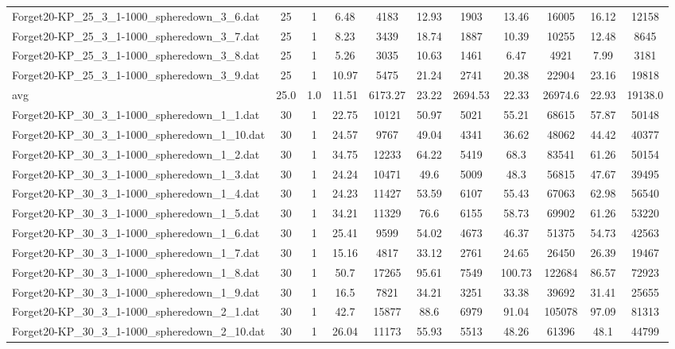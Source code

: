 \begin{table}[!ht]
\begin{tabular}{lcccccccccc}
Forget20-KP\_25\_3\_1-1000\_spheredown\_3\_6.dat & 25 & 1 & 6.48 & 4183 & 12.93 & 1903 & 13.46 & 16005 & 16.12 & 12158 \\
Forget20-KP\_25\_3\_1-1000\_spheredown\_3\_7.dat & 25 & 1 & 8.23 & 3439 & 18.74 & 1887 & 10.39 & 10255 & 12.48 & 8645 \\
Forget20-KP\_25\_3\_1-1000\_spheredown\_3\_8.dat & 25 & 1 & 5.26 & 3035 & 10.63 & 1461 & 6.47 & 4921 & 7.99 & 3181 \\
Forget20-KP\_25\_3\_1-1000\_spheredown\_3\_9.dat & 25 & 1 & 10.97 & 5475 & 21.24 & 2741 & 20.38 & 22904 & 23.16 & 19818 \\
\hline avg & 25.0 & 1.0 & 11.51& 6173.27 & 23.22& 2694.53 & 22.33& 26974.6 & 22.93& 19138.0\\ \hline
Forget20-KP\_30\_3\_1-1000\_spheredown\_1\_1.dat & 30 & 1 & 22.75 & 10121 & 50.97 & 5021 & 55.21 & 68615 & 57.87 & 50148 \\
Forget20-KP\_30\_3\_1-1000\_spheredown\_1\_10.dat & 30 & 1 & 24.57 & 9767 & 49.04 & 4341 & 36.62 & 48062 & 44.42 & 40377 \\
Forget20-KP\_30\_3\_1-1000\_spheredown\_1\_2.dat & 30 & 1 & 34.75 & 12233 & 64.22 & 5419 & 68.3 & 83541 & 61.26 & 50154 \\
Forget20-KP\_30\_3\_1-1000\_spheredown\_1\_3.dat & 30 & 1 & 24.24 & 10471 & 49.6 & 5009 & 48.3 & 56815 & 47.67 & 39495 \\
Forget20-KP\_30\_3\_1-1000\_spheredown\_1\_4.dat & 30 & 1 & 24.23 & 11427 & 53.59 & 6107 & 55.43 & 67063 & 62.98 & 56540 \\
Forget20-KP\_30\_3\_1-1000\_spheredown\_1\_5.dat & 30 & 1 & 34.21 & 11329 & 76.6 & 6155 & 58.73 & 69902 & 61.26 & 53220 \\
Forget20-KP\_30\_3\_1-1000\_spheredown\_1\_6.dat & 30 & 1 & 25.41 & 9599 & 54.02 & 4673 & 46.37 & 51375 & 54.73 & 42563 \\
Forget20-KP\_30\_3\_1-1000\_spheredown\_1\_7.dat & 30 & 1 & 15.16 & 4817 & 33.12 & 2761 & 24.65 & 26450 & 26.39 & 19467 \\
Forget20-KP\_30\_3\_1-1000\_spheredown\_1\_8.dat & 30 & 1 & 50.7 & 17265 & 95.61 & 7549 & 100.73 & 122684 & 86.57 & 72923 \\
Forget20-KP\_30\_3\_1-1000\_spheredown\_1\_9.dat & 30 & 1 & 16.5 & 7821 & 34.21 & 3251 & 33.38 & 39692 & 31.41 & 25655 \\
Forget20-KP\_30\_3\_1-1000\_spheredown\_2\_1.dat & 30 & 1 & 42.7 & 15877 & 88.6 & 6979 & 91.04 & 105078 & 97.09 & 81313 \\
Forget20-KP\_30\_3\_1-1000\_spheredown\_2\_10.dat & 30 & 1 & 26.04 & 11173 & 55.93 & 5513 & 48.26 & 61396 & 48.1 & 44799 \\

\end{tabular}
\end{table}
